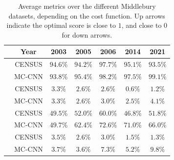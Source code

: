 \begin{table}[ht]
\centering
\renewcommand{\arraystretch}{1.5}
\begin{tabular}{|c|c||c|c|c|c|c|}
\cline{2-7}
\rowcolor{lightgray}
\multicolumn{1}{c|}{\cellcolor{white}}& Year & 2003 & 2005 & 2006 & 2014 & 2021 \\ \hline

\rowcolor{color_census}
\cellcolor{white} & CENSUS & $94.6\%$ & $94.2\%$ & $97.7\%$ & $95.1\%$ & $93.5\%$\\ \cline{2-7}

\rowcolor{color_mccnn}
\multirow{-2}{*}{\cellcolor{white} $acc$ $\uparrow$} & MC-CNN & $93.8\%$ & $95.4\%$ & $98.2\%$ & $97.5\%$ & $99.1\%$\\ \hline


\rowcolor{color_census}
\cellcolor{white} & CENSUS & $3.3\%$ & $2.6\%$ & $2.6\%$ & $0.6\%$ & $1.2\%$\\ \cline{3-7}

\rowcolor{color_mccnn}
\multirow{-2}{*}{\cellcolor{white} $s_{rel}$ $\downarrow$} & MC-CNN & $3.3\%$ & $2.6\%$ & $3.0\%$ & $2.5\%$ & $4.1\%$\\ \hline

\rowcolor{color_census}
\cellcolor{white} & CENSUS & $49.5\%$ & $52.0\%$ & $60.0\%$ & $46.8\%$ & $51.8\%$\\ \cline{3-7}

\rowcolor{color_mccnn}
\multirow{-2}{*}{\cellcolor{white} $o_{rel}$ $\downarrow$} & MC-CNN & $49.7\%$ & $62.4\%$ & $72.6\%$ & $71.0\%$ & $66.0\%$\\ \hline


\rowcolor{color_census}
\cellcolor{white} & CENSUS & $3.5\%$ & $2.6\%$ & $3.0\%$ & $1.5\%$ & $1.3\%$\\ \cline{3-7}

\rowcolor{color_mccnn}
\multirow{-2}{*}{\cellcolor{white} $\epsilon_{~~~}$ $\downarrow$} & MC-CNN & $3.7\%$ & $3.6\%$ & $7.3\%$ & $5.2\%$ & $9.8\%$\\ \hline

\end{tabular}
\renewcommand{\arraystretch}{1}
\caption{Average metrics over the different Middlebury datasets, depending on the cost function. Up arrows indicate the optimal score is close to $1$, and close to $0$ for down arrows.}\label{tab:metric_average}
\end{table}



